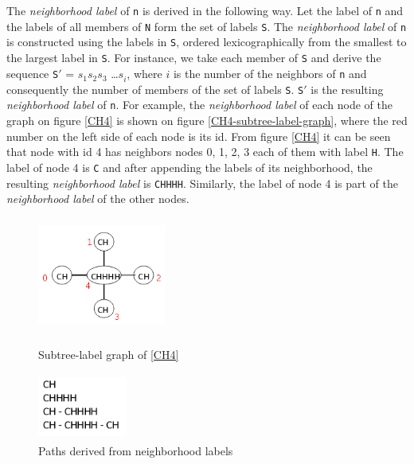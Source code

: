 \documentclass{l4proj}
\theoremstyle{definition}
\begin{document}
The \textit{neighborhood label} of \texttt{n} is derived in the following way. Let the label of \texttt{n} and the labels of all members of \texttt{N} form the set of labels \texttt{S}. The \textit{neighborhood label} of \texttt{n} is constructed using the labels in \texttt{S}, ordered lexicographically from the smallest to the largest label in \texttt{S}. For instance, we take each member of \texttt{S} and derive the sequence \texttt{S$'$} = $s^{}_1$$s^{}_2$$s^{}_3$ \ldots $s^{}_i$, where $i$ is the number of the neighbors of \texttt{n} and consequently the number of members of the set of labels \texttt{S}. \texttt{S$'$} is the resulting \textit{neighborhood label} of \texttt{n}. For example, the \textit{neighborhood label} of each node of the graph on figure \ref{CH4} is shown on figure \ref{CH4-subtree-label-graph}, where the red number on the left side of each node is its id. From figure \ref{CH4} it can be seen that node with id 4 has neighbors nodes 0, 1, 2, 3 each of them with label \texttt{H}. The label of node 4 is \texttt{C} and after appending the labels of its neighborhood, the resulting \textit{neighborhood label} is \texttt{CHHHH}. Similarly, the label of node 4 is part of the \textit{neighborhood label} of the other nodes.\par
\begin{figure}[h]
  \begin{minipage}[t]{.5\textwidth}
  \centering
  \includegraphics[height=3.8cm,width=4.2cm]{images/graphs/CH4-isomer.png}
  \caption{Subtree-label graph of \ref{CH4}}
  \label{CH4-subtree-label-graph}
  \end{minipage}%
  \begin{minipage}[t]{.5\textwidth}
  \centering
  \includegraphics[height=2.2cm,width=2.9cm]{images/paths/CH4-isomer.png}
  \caption{Paths derived from neighborhood labels}
  \label{CH4-subtree-label-paths}
  \end{minipage}
\end{figure}
\end{document}

